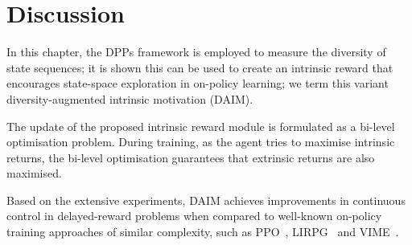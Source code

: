\begin{table}[h]
    \centering
{}
    \caption{Quantitative results comparison between DAIM and other baseline methods (A2C and LIRPG) in the Atari and SuperMarioBro games. In the table, it shows final average extrinsic rewards $\pm$ standard error across 5 different seeds of last 100 episodes in the training. The best and the second best results are (\textbf{bold}) and (\underline{underline}), respectively.}
    \label{tab:atari}
\end{table}

\section{Discussion}
In this chapter, the DPPs framework is employed to measure the diversity of state sequences; it is shown this can be used to create an intrinsic reward that encourages state-space exploration in on-policy learning; we term this variant diversity-augmented intrinsic motivation (DAIM). 

The update of the proposed intrinsic reward module is formulated as a bi-level optimisation problem. During training, as the agent tries to maximise intrinsic returns, the bi-level optimisation guarantees that extrinsic returns are also maximised. 

Based on the extensive experiments, DAIM achieves improvements in continuous control in delayed-reward problems when compared to well-known on-policy training approaches of similar complexity, such as PPO~\cite{schulman2017proximal}, LIRPG~\cite{zheng2018learning} and VIME~\cite{NIPS2016_abd81528}.

